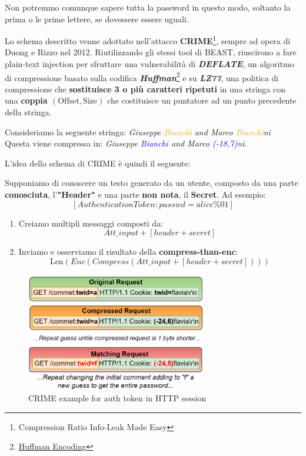\begin{note}
Non potremmo comunque sapere tutta la password in questo modo, soltanto la prima o le prime lettere, se dovessere essere uguali. 
\end{note}
Lo schema descritto venne adottato nell'attacco \textbf{CRIME}\footnote{Compression Ratio Info-Leak Made Easy}, sempre ad opera di Duong e Rizzo nel 2012. Riutilizzando gli stessi tool di BEAST, riuscirono a fare plain-text injection per sfruttare una vulnerabilità di \textit{\textbf{DEFLATE}}, un algoritmo di compressione basato sulla codifica \textit{\textbf{Huffman}}\footnote{\href{https://it.wikipedia.org/wiki/Codifica_di_Huffman}{Huffman Encoding}} e su \textbf{\textit{LZ77}}, una politica di compressione che \textbf{sostituisce 3 o più caratteri ripetuti} in una stringa con una \textbf{coppia $(\text{Offset}, \text{Size})$} che costituisce un puntatore ad un punto precedente della stringa.
\begin{example}[ LZ77]Consideriamo la seguente stringa:
\textit{Giuseppe \textcolor{orange}{Bianchi} and Marco \textcolor{orange}{Bianchi}ni}\\
Questa viene compressa in: \textit{Giuseppe \textcolor{blue}{Bianchi} and Marco \textcolor{blue}{(-18,7)}ni}.
\end{example}
L'idea dello schema di CRIME è quindi il seguente:
\begin{definition}[CRIME]\label{def:crime}
Supponiamo di conoscere un testo generato da un utente, composto da una parte \textbf{conosciuta}, l'\textbf{"Header"} e una parte \textbf{non nota}, il \textbf{Secret}. Ad esempio: \[[Authentication Token: passwd = alice\%01]\]
\begin{enumerate}
    \item Creiamo multipli messaggi composti da: 
    \[Att\_input + [header + secret]\]
    \item Inviamo e osserviamo il risultato della \textbf{compress-than-enc}:
    \[\text{Len}(Enc(Compress(Att\_input + [header + secret])))\]
\end{enumerate}
\end{definition}
\begin{figure}[h]
    \centering
    \includegraphics[width=0.7\textwidth]{image/crime.png}
    \caption{CRIME example for auth token in HTTP session}
    \label{fig:crime}
\end{figure}
